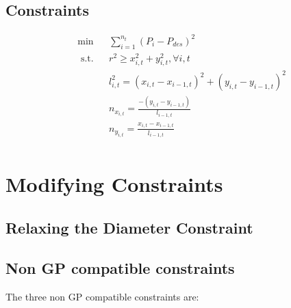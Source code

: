\documentclass[12pt]{article}
\begin{document}
	\subsection{Constraints}
	
	\begin{equation}
	\begin{aligned}
	& \min &&\sum_{i=1}^{n_t} (P_{i} - P_{des})^2\\
	& \text{ s.t.} && r^2 \geq x_{i,t}^2 + y_{i,t}^2, \forall i, t \\
	& && l_{i,t}^2 = (x_{i,t} - x_{i-1,t})^2 + (y_{i,t} - y_{i-1,t})^2 \\
	& && n_{x_{i,t}} = \frac{-(y_{i,t}-y_{i-1,t})}{l_{i-1,t}} \\
	& && n_{y_{i,t}} = \frac{x_{i,t}-x_{i-1,t}}{l_{i-1,t}} \\
	\end{aligned}
	\end{equation}
	
	\section{Modifying Constraints}

	\subsection{Relaxing the Diameter Constraint}
		
	\subsection{Non GP compatible constraints}
	The three non GP compatible constraints are:
	
	
	
\end{document}
